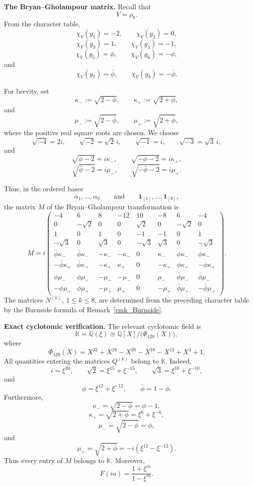 \documentclass[a4paper,reqno]{amsart}
\theoremstyle{plain} %
\theoremstyle{definition} %
\theoremstyle{remark} %
\newcommand{\1}{\mathds{1}}   %
\begin{document}
\medskip

\noindent\textbf{The Bryan--Gholampour matrix.}
Recall that
\[
V=\rho_8.
\]
From the character table,
\[
\chi_V(g_1)=-2,
\qquad
\chi_V(g_2)=0,
\]
\[
\chi_V(g_3)=1,
\qquad
\chi_V(g_4)=-1,
\]
\[
\chi_V(g_5)=\phi,
\qquad
\chi_V(g_6)=-\phi,
\]
and
\[
\chi_V(g_7)=\bar\phi,
\qquad
\chi_V(g_8)=-\bar\phi.
\]

For brevity, set
\[
\kappa_-:=\sqrt{2-\phi},
\qquad
\kappa_+:=\sqrt{2+\phi},
\]
and
\[
\mu_-:=\sqrt{2-\bar\phi},
\qquad
\mu_+:=\sqrt{2+\bar\phi},
\]
where the positive real square roots are chosen.  We choose
\[
\sqrt{-4}=2i,
\qquad
\sqrt{-2}=\sqrt2\,i,
\qquad
\sqrt{-1}=i,
\qquad
\sqrt{-3}=\sqrt3\,i,
\]
and
\[
\sqrt{\phi-2}=i\kappa_-,
\qquad
\sqrt{-\phi-2}=i\kappa_+,
\]
\[
\sqrt{\bar\phi-2}=i\mu_-,
\qquad
\sqrt{-\bar\phi-2}=i\mu_+.
\]

Thus, in the ordered bases
\[
\alpha_1,\ldots,\alpha_8
\qquad\text{and}\qquad
\mathbf1_{[1]},\ldots,\mathbf1_{[8]},
\]
the matrix \(M\) of the Bryan--Gholampour transformation is
\[
M
=
i
\begin{pmatrix}
-4&6&8&-12&10&-8&6&-4\\
0&-\sqrt2&0&0&\sqrt2&0&-\sqrt2&0\\
1&0&1&0&-1&-1&0&1\\
-\sqrt3&0&\sqrt3&0&-\sqrt3&\sqrt3&0&-\sqrt3\\
\bar\phi\kappa_-&\bar\phi\kappa_-&-\kappa_-&-\kappa_-&
0&\kappa_-&\phi\kappa_-&\phi\kappa_-\\
-\bar\phi\kappa_+&\bar\phi\kappa_+&-\kappa_+&\kappa_+&
0&-\kappa_+&\phi\kappa_+&-\phi\kappa_+\\
\phi\mu_-&\phi\mu_-&-\mu_-&-\mu_-&
0&\mu_-&\bar\phi\mu_-&\bar\phi\mu_-\\
-\phi\mu_+&\phi\mu_+&-\mu_+&\mu_+&
0&-\mu_+&\bar\phi\mu_+&-\bar\phi\mu_+
\end{pmatrix}.
\]
The matrices \(N^{(k)}\), \(1\le k\le8\), are determined from the
preceding character table by the Burnside formula of Remark~\ref{rmk_Burnside}.

\medskip

\noindent\textbf{Exact cyclotomic verification.}
The relevant cyclotomic field is
\[
\mathbb K
=
\mathbb Q(\xi)
\cong
\mathbb Q[X]/\bigl(\Phi_{120}(X)\bigr),
\]
where
\[
\Phi_{120}(X)
=
X^{32}+X^{28}-X^{20}-X^{16}-X^{12}+X^4+1.
\]
All quantities entering the matrices \(Q^{(k)}\) belong to
\(\mathbb K\).  Indeed,
\[
i=\xi^{30},
\qquad
\sqrt2=\xi^{15}+\xi^{-15},
\qquad
\sqrt3=\xi^{10}+\xi^{-10},
\]
and
\[
\phi=\xi^{12}+\xi^{-12},
\qquad
\bar\phi=1-\phi.
\]
Furthermore,
\[
\kappa_-
=
\sqrt{2-\phi}
=
\phi-1,
\]
\[
\kappa_+
=
\sqrt{2+\phi}
=
\xi^6+\xi^{-6},
\]
\[
\mu_-
=
\sqrt{2-\bar\phi}
=
\phi,
\]
and
\[
\mu_+
=
\sqrt{2+\bar\phi}
=
-i(\xi^{12}-\xi^{-12}).
\]
Thus every entry of \(M\) belongs to \(\mathbb K\).  Moreover,
\[
F(m)
=
\frac{1+\xi^m}{1-\xi^m}.
\]
\end{document}
